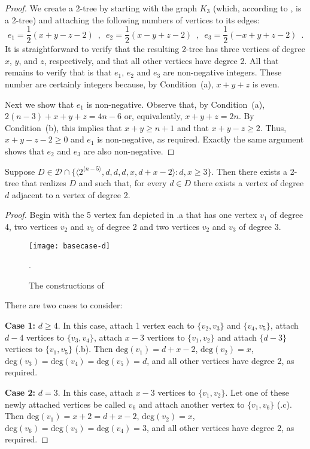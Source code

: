 \documentclass[lotsofwhite,charterfonts]{patmorin}
\newcommand{\rep}[1]{^{\langle#1\rangle}}
\newcommand{\degreesum}{Condition~(a)}
\newcommand{\maxdegree}{Condition~(b)}
\newcommand{\degree}{\mathrm{deg}}
\begin{document}
\begin{proof}
We create a 2-tree by starting with the graph $K_3$ (which, according
to , is a
2-tree) and attaching the following numbers of vertices to its edges:
\[
    e_1=\frac{1}{2}(x+y-z-2) \enspace , \enspace
    e_2=\frac{1}{2}(x-y+z-2) \enspace , \enspace 
    e_3=\frac{1}{2}(-x+y+z-2) \enspace .
\]
It is straightforward to verify that the resulting 2-tree has three
vertices of degree $x$, $y$, and $z$, respectively, and that all other
vertices have degree 2.  All that remains to verify that is that
$e_1$, $e_2$ and $e_3$ are non-negative integers.  These number are
certainly integers because, by \degreesum, $x+y+z$ is even.  

Next we show that $e_1$ is non-negative.  Observe that, by \degreesum,
$2(n-3)+x+y+z = 4n-6$ or, equivalently, $x+y+z=2n$.  By \maxdegree,
this implies that $x+y \ge n+1$ and that $x+y-z \ge 2$.  Thus,
$x+y-z-2 \ge 0$ and $e_1$ is non-negative, as required.  
Exactly the same argument shows that $e_2$ and $e_3$ are also
non-negative.
\end{proof}

\begin{lem}
Suppose $D\in \mathcal{D}\cap \{\langle 2\rep{n-5},d,d,d,x,d+x-2 \rangle:
\mbox{$d,x\ge 3$}\}$.
Then there exists a 2-tree that realizes $D$ and such that, for every
$d\in D$ there exists a vertex of degree $d$ adjacent to a vertex of
degree 2.
\end{lem}

\begin{proof}
Begin with the 5 vertex fan depicted in .a that has
one vertex $v_1$ of degree 4, two vertices $v_2$ and $v_5$ of degree 2
and two vertices $v_2$ and $v_3$ of degree 3.  
\begin{figure}
\begin{center}
\texttt{[image: basecase-d]}
\caption{The constructions of }.
\end{center}
\end{figure}

There are two cases to
consider:

\noindent\textbf{Case 1:} $d\ge 4$.  In this case, attach 1 vertex
each to $\{v_2,v_3\}$ and $\{v_4,v_5\}$, attach $d-4$ vertices to
$\{v_3,v_4\}$, attach $x-3$ vertices to $\{v_1,v_2\}$ and attach
$\{d-3\}$ vertices to $\{v_1,v_5\}$ (.b).  Then
$\degree(v_1)=d+x-2$, $\degree(v_2)=x$,
$\degree(v_3)=\degree(v_4)=\degree(v_5)=d$, and all other vertices
have degree 2, as required.

\noindent\textbf{Case 2:} $d=3$.  In this case, attach $x-3$ vertices
to $\{v_1,v_2\}$.  Let one of these newly attached vertices be called
$v_6$ and attach another vertex to $\{v_1,v_6\}$
(.c).  Then $\degree(v_1)=x+2=d+x-2$,
$\degree(v_2)=x$, $\degree(v_6)=\degree(v_3)=\degree(v_4)=3$, and
all other vertices have degree 2, as required. 
\end{proof}
\end{document}
